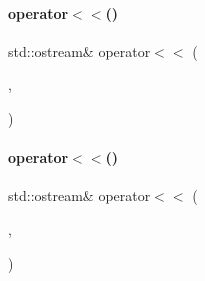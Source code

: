 \paragraph{\texorpdfstring{operator$<$$<$()}{operator<<()}\hspace{0.1cm}{\footnotesize\ttfamily [19/20]}}
{\footnotesize\ttfamily std\+::ostream\& operator$<$$<$ (\begin{DoxyParamCaption}\item[{std\+::ostream \&}]{,  }\item[{const \mbox{\hyperlink{class_h_d_d}{H\+DD}} \&}]{ }\end{DoxyParamCaption})}

\mbox{\label{_parts_8h_a3cd50fc84d17bbd6f412f72c5b5cbbfc}} 
\paragraph{\texorpdfstring{operator$<$$<$()}{operator<<()}\hspace{0.1cm}{\footnotesize\ttfamily [20/20]}}
{\footnotesize\ttfamily std\+::ostream\& operator$<$$<$ (\begin{DoxyParamCaption}\item[{\mbox{\hyperlink{structutos__ostream}{utos\+\_\+ostream}}}]{,  }\item[{const \mbox{\hyperlink{class_h_d_d}{H\+DD}} \&}]{ }\end{DoxyParamCaption})}

